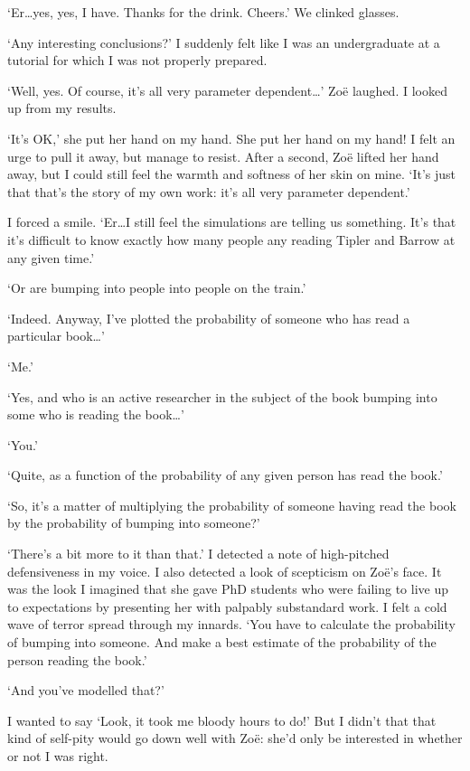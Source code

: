 `Er\dots yes, yes, I have. Thanks for the drink. Cheers.' We clinked
glasses.

`Any interesting conclusions?' I suddenly felt like I was an
undergraduate at a tutorial for which I was not properly prepared.

`Well, yes. Of course, it's all very parameter dependent\dots'
Zoë laughed. I looked up from my results.

`It's OK,' she put her hand on my hand. She put her hand on my hand!
I felt an urge to pull it away, but manage to resist. After a
second, Zoë lifted her hand away, but I could still feel the
warmth and softness of her skin on mine. `It's just that that's the
story of my own work: it's all very parameter dependent.'

I forced a smile. `Er\dots I still feel the simulations are telling
us something. It's that it's difficult to know exactly how many
people any reading Tipler and Barrow at any given time.'

`Or are bumping into people into people on the train.'

`Indeed. Anyway, I've plotted the probability of someone who has
read a particular book\dots'

`Me.'

`Yes, and who is an active researcher in the subject of the book
bumping into some who is reading the book\dots'

`You.'

`Quite, as a function of the probability of any given person has
read the book.'

`So, it's a matter of multiplying the probability of someone having
read the book by the probability of bumping into someone?'

`There's a bit more to it than that.' I detected a note of
high-pitched defensiveness in my voice. I also detected a look of
scepticism on Zoë's face. It was the look I imagined that she
gave PhD students who were failing to live up to expectations by
presenting her with palpably substandard work. I felt a cold wave of
terror spread through my innards. `You have to calculate the
probability of bumping into someone. And make a best estimate of the
probability of the person reading the book.'

`And you've modelled that?'

I wanted to say `Look, it took me bloody hours to do!' But I didn't
that that kind of self-pity would go down well with Zoë: she'd
only be interested in whether or not I was right.

